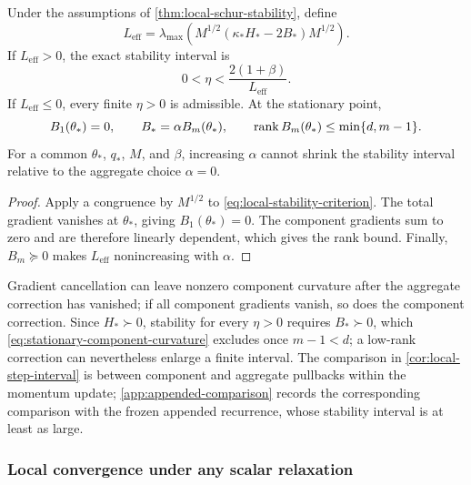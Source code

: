 \begin{corollary}
\label{cor:local-step-interval}
Under the assumptions of \cref{thm:local-schur-stability}, define
\begin{equation}
  L_{\mathrm{eff}}
  =\lambda_{\max}\!\left(
  M^{1/2}(\kappa_*H_*-2B_*)M^{1/2}\right).
  \label{eq:effective-local-stiffness}
\end{equation}
If \(L_{\mathrm{eff}}>0\), the exact stability interval is
\begin{equation}
  0<\eta<\frac{2(1+\beta)}{L_{\mathrm{eff}}}.
  \label{eq:exact-local-step-interval}
\end{equation}
If \(L_{\mathrm{eff}}\leq0\), every finite \(\eta>0\) is admissible.
At the stationary point,
\begin{equation}
  B_1(\theta_*)=0,
  \qquad B_*=\alpha B_m(\theta_*),
  \qquad \operatorname{rank} B_m(\theta_*)\leq\min\{d,m-1\}.
  \label{eq:stationary-component-curvature}
\end{equation}
For a common \(\theta_*\), \(q_*\), \(M\), and \(\beta\), increasing
\(\alpha\) cannot shrink the stability interval relative to the aggregate
choice \(\alpha=0\).
\end{corollary}

\begin{proof}
Apply a congruence by \(M^{1/2}\) to
\cref{eq:local-stability-criterion}. The total gradient vanishes at
\(\theta_*\), giving \(B_1(\theta_*)=0\). The component gradients sum
to zero and are therefore linearly dependent, which gives the rank bound.
Finally, \(B_m\succeq0\) makes \(L_{\mathrm{eff}}\) nonincreasing with
\(\alpha\).
\end{proof}

\begin{remark}
\label{rem:stationary-cancellation}
Gradient cancellation can leave nonzero component curvature after the
aggregate correction has vanished; if all component gradients vanish, so does
the component correction. Since \(H_*\succ0\), stability for every
\(\eta>0\) requires \(B_*\succ0\), which \cref{eq:stationary-component-curvature}
excludes once \(m-1<d\); a low-rank correction can nevertheless enlarge a
finite interval. The comparison in \cref{cor:local-step-interval} is between
component and aggregate pullbacks within the momentum update;
\cref{app:appended-comparison} records the corresponding comparison with the
frozen appended recurrence, whose stability interval is at least as large.
\end{remark}

\subsubsection{Local convergence under any scalar relaxation}
\label{sec:local-relaxed-convergence}

